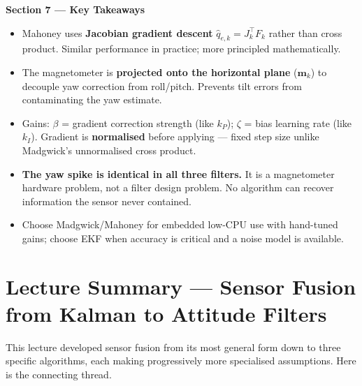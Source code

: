 \documentclass[12pt, a4paper]{article}
\begin{document}
\begin{keybox}
  \textbf{Section 7 --- Key Takeaways}
  \begin{itemize}[leftmargin=1.2em, itemsep=2pt]
    \item Mahoney uses \textbf{Jacobian gradient descent}
      $\hat{q}_{e,k} = J_k^\top F_k$ rather than cross product.
      Similar performance in practice; more principled mathematically.

    \item The magnetometer is \textbf{projected onto the horizontal plane}
      ($\mathbf{m}_k$) to decouple yaw correction from roll/pitch.
      Prevents tilt errors from contaminating the yaw estimate.

    \item Gains: $\beta$ = gradient correction strength (like $k_P$);
      $\zeta$ = bias learning rate (like $k_I$).
      Gradient is \textbf{normalised} before applying --- fixed step size
      unlike Madgwick's unnormalised cross product.

    \item \textbf{The yaw spike is identical in all three filters.}
      It is a magnetometer hardware problem, not a filter design problem.
      No algorithm can recover information the sensor never contained.

    \item Choose Madgwick/Mahoney for embedded low-CPU use with
      hand-tuned gains; choose EKF when accuracy is critical and a
      noise model is available.
  \end{itemize}
\end{keybox}

\newpage
\section*{Lecture Summary --- Sensor Fusion from Kalman to Attitude Filters}

This lecture developed sensor fusion from its most general form down to
three specific algorithms, each making progressively more specialised
assumptions.
Here is the connecting thread.
\end{document}
